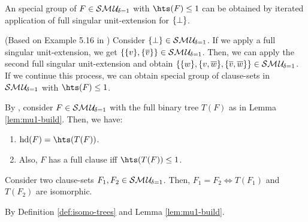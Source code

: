 \documentclass{article}
\begin{document}
\begin{lem}\label{lem:mu1-strc}
An special group of $F \in \mathcal{S}\mathcal{M\hspace{0.8pt}U}_{\!\delta=1}$ with $\hts(F) \le 1$ can be obtained by iterated application of full singular unit-extension for $\{ \bot \}$.
\end{lem}
\begin{prf}
(Based on Example 5.16 in \cite{KullmannZhao2010Extremal}) Consider $\{ \bot \} \in \mathcal{S}\mathcal{M\hspace{0.8pt}U}_{\!\delta=1}$. If we apply a full singular unit-extension, we get $\{ \{ v \},\{ \overline{v} \} \} \in \mathcal{S}\mathcal{M\hspace{0.8pt}U}_{\!\delta=1}$. Then, we can apply the second full singular unit-extension and obtain $\{ \{ w \},\{ v,\overline{w} \},\{ \overline{v},\overline{w} \} \}\in \mathcal{S}\mathcal{M\hspace{0.8pt}U}_{\!\delta=1}$. If we continue this process, we can obtain special group of clause-sets in $\mathcal{S}\mathcal{M\hspace{0.8pt}U}_{\!\delta=1}$ with $\hts(F) \le 1$.
\end{prf}

\begin{lem}\label{lem:smu1hs1}
By \cite{GwynneKullmann2013GoodRepresentations}, consider $F \in \mathcal{S}\mathcal{M\hspace{0.8pt}U}_{\!\delta=1}$ with the full binary tree $T(F)$ as in Lemma \ref{lem:mu1-build}. Then, we have:
  \begin{enumerate}
  \item $\hardness(F) = \hts(T(F))$.
  \item Also, $F$ has a full clause iff $\hts(T(F)) \le 1$.
  \end{enumerate}
\end{lem}

\begin{lem}\label{lem:mu1-iso}
Consider two clause-sets $F_1,F_2 \in \mathcal{S}\mathcal{M\hspace{0.8pt}U}_{\!\delta=1}$. Then, $F_1=F_2 \iff T(F_1) $ and $T(F_2)$ are isomorphic.
\end{lem}    
\begin{prf}
By Definition \ref{def:isomo-trees} and Lemma \ref{lem:mu1-build}.
\end{prf}                                                                                                     
                                                                                                                                                                                                                                           
\end{document}
